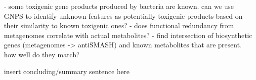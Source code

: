 \documentclass[12pt]{article}
\begin{document}
- some toxigenic gene products produced by bacteria are known. can we use GNPS to identify unknown features as potentially toxigenic products based on their similarity to known toxigenic ones?
- does functional redundancy from metagenomes correlate with actual metabolites?
- find intersection of biosynthetic genes (metagenomes -> antiSMASH) and known metabolites that are present. how well do they match?

insert concluding/summary sentence here

\pagebreak

\section*{\refname}
\footnotesize{

\par}
\end{document}
